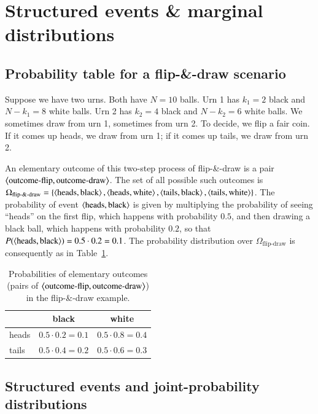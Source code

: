 \documentclass[nobib,nofonts]{tufte-handout}
\newcommand{\mult}{\ensuremath{\cdot}}
\begin{document}
\newpage

\section{Structured events \& marginal distributions}

\subsection{Probability table for a flip-\&-draw scenario}

Suppose we have two urns. Both have $N=10$ balls. Urn 1 has $k_1=2$ black and $N-k_1 = 8$ white
balls. Urn 2 has $k_2=4$ black and $N-k_2=6$ white balls. We sometimes draw from urn 1,
sometimes from urn 2. To decide, we flip a fair coin. If it comes up heads, we draw from urn 1;
if it comes up tails, we draw from urn 2.

An elementary outcome of this two-step process of flip-\&-draw is a pair
$\left \langle \text{outcome-flip}, \text{outcome-draw}\right\rangle$. The set of all possible such outcomes is
$\Omega_{\text{flip-\&-draw}} = \left\{\left \langle \text{heads}, \text{black}\right\rangle, \left \langle \text{heads},
    \text{white}\right\rangle, \left \langle \text{tails}, \text{black}\right\rangle, \left \langle \text{tails},
    \text{white}\right\rangle\right\}$. The probability of event $\left \langle \text{heads}, \text{black}\right\rangle$ is given by
multiplying the probability of seeing ``heads'' on the first flip, which happens with
probability $0.5$, and then drawing a black ball, which happens with probability $0.2$, so that
$P(\left \langle \text{heads}, \text{black}\right\rangle) = 0.5 \cdot 0.2 = 0.1$. The probability distribution
over $\Omega_{\text{flip-draw}}$ is consequently as in
Table~\ref{tab:flip-and-draw:probabilities}.
%
\begin{table}
  \centering
  \begin{tabular}{lcc}
    & black & white \\ \midrule
    heads & $0.5 \mult 0.2 = 0.1$  & $0.5 \mult 0.8 = 0.4$ \\
    tails & $0.5 \mult 0.4 = 0.2$  & $0.5 \mult 0.6 = 0.3$
  \end{tabular}
  \caption{Probabilities of elementary outcomes (pairs of $\left \langle \text{outcome-flip},
      \text{outcome-draw}\right\rangle$) in the flip-\&-draw example.}
  \label{tab:flip-and-draw:probabilities}
\end{table}

\subsection{Structured events and joint-probability distributions}
\end{document}
